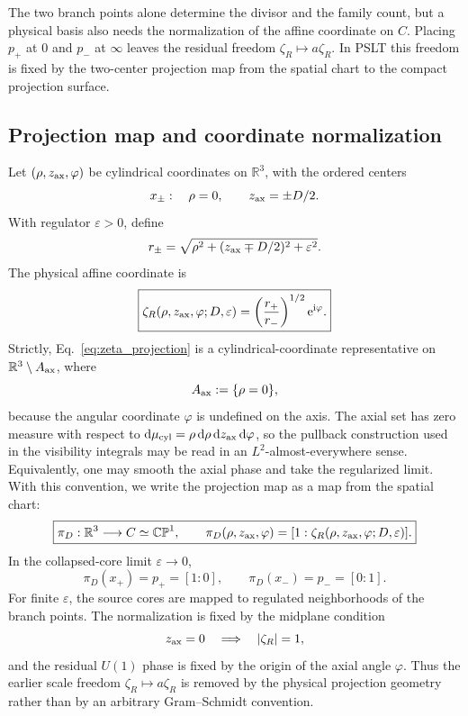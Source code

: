 \documentclass[aps,prd,preprint,notitlepage,nofootinbib,superscriptaddress,floatfix]{revtex4-2}
\newcommand{\dd}{\mathrm{d}}
\newcommand{\ee}{\mathrm{e}}
\newcommand{\ii}{\mathrm{i}}
\newcommand{\CP}{\mathbb{CP}}
\theoremstyle{remark}
\begin{document}
The two branch points alone determine the divisor and the family count, but a physical basis also needs the normalization of the affine coordinate on \(C\).
Placing \(p_+\) at \(0\) and \(p_-\) at \(\infty\) leaves the residual freedom \(\zeta_R\mapsto a\zeta_R\).
In PSLT this freedom is fixed by the two-center projection map from the spatial chart to the compact projection surface.

\subsection{Projection map and coordinate normalization}
\label{sec:projection_map}

Let \((\rho,z_{\rm ax},\varphi)\) be cylindrical coordinates on \(\mathbb R^3\), with the ordered centers
\begin{equation}
x_\pm:\quad \rho=0,\qquad z_{\rm ax}=\pm D/2.
\label{eq:spatial_centers}
\end{equation}
With regulator \(\varepsilon>0\), define
\begin{equation}
r_\pm
=
\sqrt{\rho^2+(z_{\rm ax}\mp D/2)^2+\varepsilon^2}.
\label{eq:rpm_projection}
\end{equation}
The physical affine coordinate is
\begin{equation}
\boxed{
\zeta_R(\rho,z_{\rm ax},\varphi;D,\varepsilon)
=
\left(\frac{r_+}{r_-}\right)^{1/2}\ee^{\ii\varphi}.
}
\label{eq:zeta_projection}
\end{equation}
Strictly, Eq.~\eqref{eq:zeta_projection} is a cylindrical-coordinate representative on
\(\mathbb R^3\setminus A_{\rm ax}\), where
\begin{equation}
A_{\rm ax}:=\{\rho=0\},
\end{equation}
because the angular coordinate \(\varphi\) is undefined on the axis.
The axial set has zero measure with respect to
\(\dd\mu_{\rm cyl}=\rho\,\dd\rho\,\dd z_{\rm ax}\,\dd\varphi\), so the pullback
construction used in the visibility integrals may be read in an \(L^2\)-almost-everywhere sense.
Equivalently, one may smooth the axial phase and take the regularized limit.
With this convention, we write the projection map as a map from the spatial chart:
\begin{equation}
\boxed{
\pi_D:\mathbb R^3\longrightarrow C\simeq\CP^1,
\qquad
\pi_D(\rho,z_{\rm ax},\varphi)
=
[1:\zeta_R(\rho,z_{\rm ax},\varphi;D,\varepsilon)].
}
\label{eq:piD_def}
\end{equation}
In the collapsed-core limit \(\varepsilon\to0\),
\begin{equation}
\pi_D(x_+)=p_+=[1:0],
\qquad
\pi_D(x_-)=p_-=[0:1].
\label{eq:piD_centers}
\end{equation}
For finite \(\varepsilon\), the source cores are mapped to regulated neighborhoods of the branch points.
The normalization is fixed by the midplane condition
\begin{equation}
z_{\rm ax}=0
\quad\Longrightarrow\quad
|\zeta_R|=1,
\label{eq:zeta_midplane}
\end{equation}
and the residual \(U(1)\) phase is fixed by the origin of the axial angle \(\varphi\).
Thus the earlier scale freedom \(\zeta_R\mapsto a\zeta_R\) is removed by the physical projection geometry rather than by an arbitrary Gram--Schmidt convention.
\end{document}
